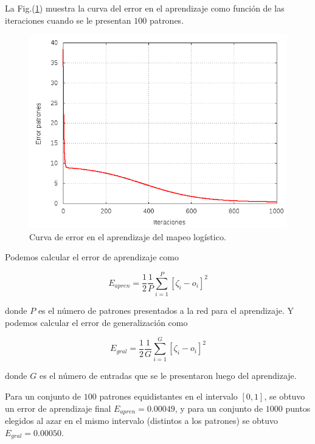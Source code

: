 \documentclass[aps,prb,onecolumn,10pt,floatfix,superscriptaddress]{article} %
\begin{document}
La Fig.(\ref{error_log}) muestra la curva del error en el aprendizaje como funci\'on de las iteraciones cuando se le presentan $100$ patrones.

\begin{figure}[!htd]
\begin{center}
 \includegraphics[scale=0.4]{error_log.png}
  \caption{\label{error_log} Curva de error en el aprendizaje del mapeo log\'istico.}
  \end{center}
 \end{figure}


Podemos calcular el error de aprendizaje como

\begin{equation}
E_{apren} = \frac{1}{2} \frac{1}{P} \sum^{P}_{i=1} [\zeta_{i} - o_{i}]^{2}
\end{equation}

donde $P$ es el n\'umero de patrones presentados a la red para el aprendizaje. Y podemos calcular el error de generalizaci\'on como 

\begin{equation}
E_{gral} = \frac{1}{2} \frac{1}{G} \sum^{G}_{i=1} [\zeta_{i} - o_{i}]^{2}
\end{equation}

donde $G$ es el n\'umero de entradas que se le presentaron luego del aprendizaje.

Para un conjunto de $100$ patrones equidistantes en el intervalo $[0,1]$, se obtuvo un error de aprendizaje final $E_{apren} = 0.00049$, y para un conjunto de $1000$ puntos elegidos al azar en el mismo intervalo (distintos a los patrones) se obtuvo $E_{gral} = 0.00050$.
\end{document}
